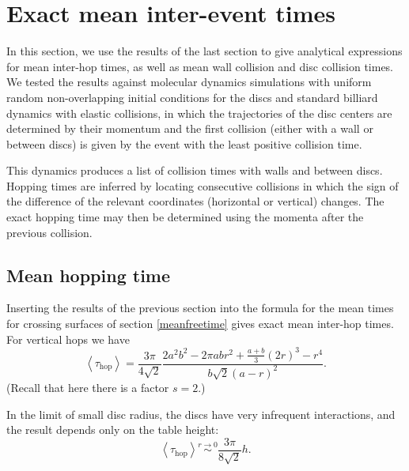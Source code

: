 \documentclass[superscriptaddress,pre,reprint,showpacs,twocolumn]{revtex4-1}
\newcommand{\mean}[1]{\left \langle #1 \right \rangle}
\begin{document}
\section{Exact mean inter-event times}

In this section, we use the results of the last section to give
analytical expressions for mean inter-hop times, as well as mean wall collision and disc collision times.
We tested the results against molecular dynamics simulations with uniform random non-overlapping initial conditions for the discs and standard billiard dynamics with elastic collisions, in which 
the trajectories of the disc centers 
are determined by their momentum and the first collision
(either with a wall or between discs) is given by
the event with the least positive collision time. 

This dynamics produces a list of collision times with walls and between discs.
Hopping times are inferred by locating consecutive collisions in which the sign of the difference of the relevant coordinates (horizontal or vertical) changes.
The exact hopping time may then be determined 
using the momenta after the previous collision.




\subsection{Mean hopping time}

 
Inserting the results of the previous section 
into the formula for the mean times for crossing
surfaces of section \eqref{meanfreetime} gives exact mean inter-hop times.
For vertical
hops we have
\begin{equation}\label{hoptau}
 \mean{\tau_\text{hop}} = 	
\frac{3 \pi}{4\sqrt{2}}
\frac{2 a^{2} b^{2}  - 2 \pi a b r^{2} + \textstyle \frac{a+b}{3}  (2r)^{3}  -  r^4}
{ b \sqrt{2}  ( a - r )^2}.
\end{equation}
(Recall that here there is a factor $s = 2$.)

In the limit of small disc radius, the discs have very infrequent interactions, and the result depends only
on the table height:
\begin{equation}\label{hoptaulimit}
 \mean{\tau_\text{hop}} \overset{r \to 0}{\sim}
\frac{3 \pi}{8\sqrt{2}}h.
\end{equation}
\end{document}

